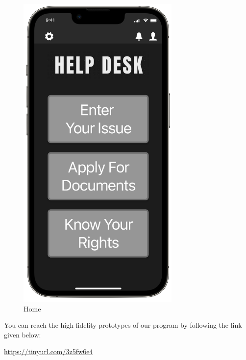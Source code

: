 \documentclass[acmtog]{acmart}
\begin{document}
\begin{figure}[H]
    \includegraphics[width=8cm]{Prototype/MockUps/Mockup2.png}
    \caption{Home}
\end{figure}
You can reach the high fidelity prototypes of our program by following the link given below:


\url{https://tinyurl.com/3z5fw6e4}

\clearpage
\end{document}

